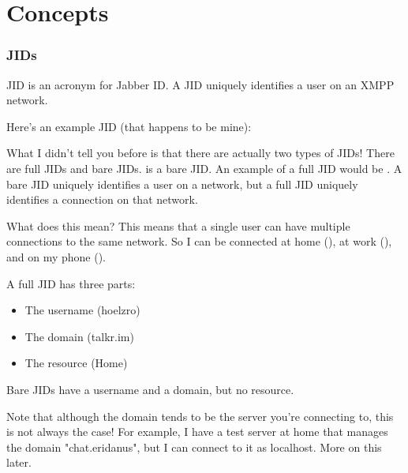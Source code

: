 \part{Concepts}

\newpage
\section*{JIDs}
\pause

JID is an acronym for Jabber ID.  A JID uniquely identifies a user on an XMPP network.

\pause

Here's an example JID (that happens to be mine): 

\pause

What I didn't tell you before is that there are actually two types of JIDs!  There are full JIDs
and bare JIDs.   is a bare JID.  An example of a full JID would be .
A bare JID uniquely identifies a user on a network, but a full JID uniquely identifies a connection on that
network.

\pause

What does this mean?  This means that a single user can have multiple connections to the same network.  So I can be
connected at home (), at work (), and on my phone ().

\pause

A full JID has three parts:
\pause

\begin{itemize}
\item The username (hoelzro)
\pause
\item The domain (talkr.im)
\pause
\item The resource (Home)
\end{itemize}
\pause

Bare JIDs have a username and a domain, but no resource.

\pause

Note that although the domain tends to be the server you're connecting to, this is not always the case!  For example, I have
a test server at home that manages the domain "chat.eridanus", but I can connect to it as localhost.  More on this later.
